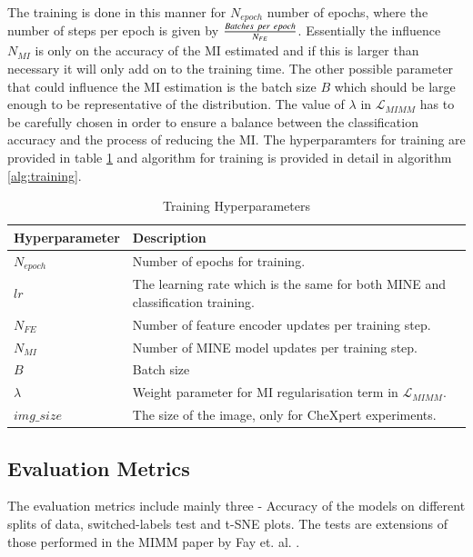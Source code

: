 \documentclass[12pt,DIV14,BCOR12mm,a4paper,footinclude=false,headinclude,parskip=half-,twoside,openright,cleardoublepage=empty,toc=index,bibliography=totoc,listof=totoc]{scrreprt}
\numberwithin{equation}{chapter}
\begin{document}
The training is done in this manner for $N_{epoch}$ number of epochs, where the number of steps per epoch is given by $\frac{Batches\hspace{0.1cm} per\hspace{0.1cm} epoch}{N_{FE}}$. Essentially the influence $N_{MI}$ is only on the accuracy of the MI estimated and if this is larger than necessary it will only add on to the training time. The other possible parameter that could influence the MI estimation is the batch size $B$ which should be large enough to be representative of the distribution. The value of $\lambda$ in $\mathcal{L}_{MIMM}$ has to be carefully chosen in order to ensure a balance between the classification accuracy and the process of reducing the MI. The hyperparamters for training are provided in table \ref{tab:hyperparameters} and algorithm for training is provided in detail in algorithm \ref{alg:training}. 

\begin{table}[H]
    \centering
    \begin{tabular}{|l|p{10cm}|}
        \hline
        \textbf{Hyperparameter} & \textbf{Description} \\
        \hline
        $N_{epoch}$ & Number of epochs for training. \\
        $lr$ & The learning rate which is the same for both MINE and classification training.\\
        $N_{FE}$ & Number of feature encoder updates per training step.\\
        $N_{MI}$ & Number of MINE model updates per training step. \\
        $B$ & Batch size \\
        $\lambda$ & Weight parameter for MI regularisation term in $\mathcal{L}_{MIMM}$.  \\
        $img\_size$ & The size of the image, only for CheXpert experiments.\\
        \hline
    \end{tabular}
    \caption{Training Hyperparameters}
    \label{tab:hyperparameters}
\end{table}

\subsection{Evaluation Metrics}

The evaluation metrics include mainly three - Accuracy of the models on different splits of data, switched-labels test and t-SNE plots. The tests are extensions of those performed in the MIMM paper by Fay et. al. \cite{10162210}.
\end{document}
